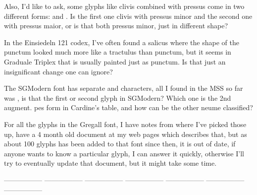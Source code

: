 \documentclass[a4paper]{article}
\begin{document}
Also, I'd like to ask, some glyphs like clivis combined with pressus come
in two different forms:
\quad{}\quad and
\quad{}\quad.  Is the first one clivis with
pressus minor and the second one with pressus maior, or is that both pressus
minor, just in different shape?

In the Einsiedeln 121 codex, I've often found a salicus where the shape of
the punctum looked much more like a tractulus than punctum, but it seems
in Graduale Triplex that is usually painted just as punctum.  Is that just
an insignificant change one can ignore?

The SGModern font has separate {\fontsize{16}{16}\color{red}\GreGallModern{}}\quad and \quad
characters, all I found in the MSS so far was \quad, is that
the first or second glyph in SGModern?  Which one is the 2nd augment. pes form in
Cardine's table, and how can be the other neume classified?

For all the glyphs in the Gregall font, I have notes from where I've picked
those up, have a 4 month old document at my web pages which describes that,
but as about 100 glyphs has been added to that font since then, it is out of
date, if anyone wants to know a particular glyph, I can answer it quickly,
otherwise I'll try to eventually update that document, but it might take
some time.

\vfill
\hbox{}
\vfill
-----------------
\vfill
\hbox{}
\vfill
-----------------
\vfill
\hbox{}
\vfill
-----------------
\vfill
\hbox{}
\vfill
-----------------
\vfill
\hbox{}
\vfill
-----------------
\vfill
\hbox{}
\vfill
-----------------
\vfill
\hbox{}
\vfill
-----------------
\vfill
\hbox{}
\vfill
\end{document}
